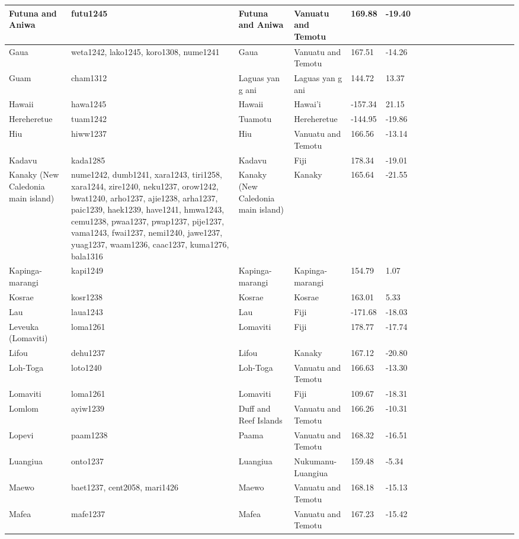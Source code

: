 \documentclass[a4paper,10pt]{article} %
\begin{document}
\begin{landscape}
\begin{longtable}{| p{2.5cm} |  p{7cm} | p{2.5cm}  | p{2.5cm}  | p{2.5cm}  | p{2.5cm}  | p{2.5cm}  | p{2cm}  | p{1cm} | p{1cm}  | p{1cm} | p{1cm}  | p{1.5cm}  | p{1cm} | p{1cm}  | p{1cm}  |p{1cm}  | p{1cm}    |}
 Futuna and Aniwa & futu1245 & Futuna and Aniwa & Vanuatu and Temotu & 169.88 & -19.40 \\ \hline
 Gaua & weta1242, lako1245, koro1308, nume1241 & Gaua & Vanuatu and Temotu & 167.51 & -14.26 \\ \hline
 Guam & cham1312 & Laguas yan g ani & Laguas yan g ani & 144.72 & 13.37 \\ \hline
 Hawaii & hawa1245 & Hawaii & Hawai'i & -157.34 & 21.15 \\ \hline
 Hereheretue & tuam1242 & Tuamotu & Hereheretue & -144.95 & -19.86 \\ \hline
 Hiu & hiww1237 & Hiu & Vanuatu and Temotu & 166.56 & -13.14 \\ \hline
 Kadavu & kada1285 & Kadavu & Fiji & 178.34 & -19.01 \\ \hline
 Kanaky (New Caledonia main island) & nume1242, dumb1241, xara1243, tiri1258, xara1244, zire1240, neku1237, orow1242, bwat1240, arho1237, ajie1238, arha1237, paic1239, haek1239, have1241, hmwa1243, cemu1238, pwaa1237, pwap1237, pije1237, vama1243, fwai1237, nemi1240, jawe1237, yuag1237, waam1236, caac1237, kuma1276, bala1316 & Kanaky (New Caledonia main island) & Kanaky & 165.64 & -21.55 \\ \hline
 Kapinga- marangi & kapi1249 & Kapinga- marangi & Kapinga- marangi & 154.79 & 1.07 \\ \hline
 Kosrae & kosr1238 & Kosrae & Kosrae & 163.01 & 5.33 \\ \hline
 Lau & laua1243 & Lau & Fiji & -171.68 & -18.03 \\ \hline
 Leveuka (Lomaviti) & loma1261 & Lomaviti & Fiji & 178.77 & -17.74 \\ \hline
 Lifou & dehu1237 & Lifou & Kanaky & 167.12 & -20.80 \\ \hline
 Loh-Toga & loto1240 & Loh-Toga & Vanuatu and Temotu & 166.63 & -13.30 \\ \hline
 Lomaviti & loma1261 & Lomaviti & Fiji & 109.67 & -18.31 \\ \hline
 Lomlom & ayiw1239 & Duff and Reef Islands & Vanuatu and Temotu & 166.26 & -10.31 \\ \hline
 Lopevi & paam1238 & Paama & Vanuatu and Temotu & 168.32 & -16.51 \\ \hline
 Luangiua & onto1237 & Luangiua & Nukumanu-Luangiua & 159.48 & -5.34 \\ \hline
 Maewo & baet1237, cent2058, mari1426 & Maewo & Vanuatu and Temotu & 168.18 & -15.13 \\ \hline
 Mafea & mafe1237 & Mafea & Vanuatu and Temotu & 167.23 & -15.42 \\ \hline

\end{longtable}
\end{landscape}
\end{document}
